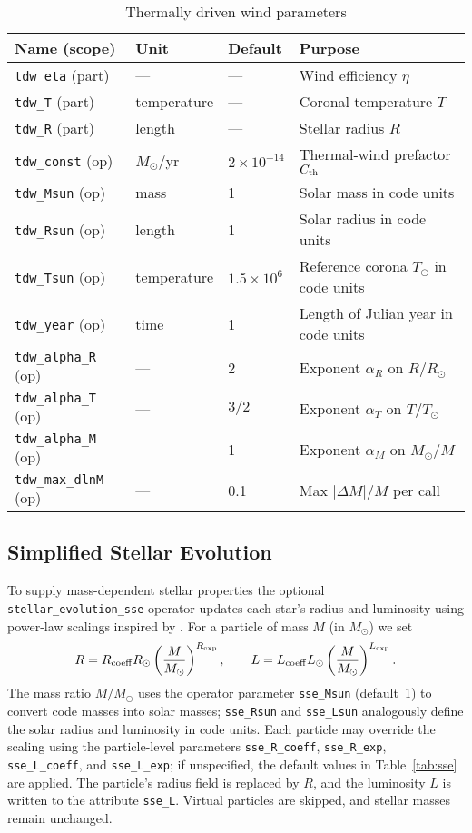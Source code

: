 \documentclass[11pt]{article}
\begin{document}
\begin{table}[h]
\centering\footnotesize
\caption{Thermally driven wind parameters}
\label{tab:tdw}
\begin{tabular}{@{}llll@{}}
\toprule
Name (scope) & Unit & Default & Purpose \\
\midrule
\texttt{tdw\_eta} (part) & — & — & Wind efficiency $\eta$\\
\texttt{tdw\_T}   (part) & temperature & — & Coronal temperature $T$\\
\texttt{tdw\_R}   (part) & length & — & Stellar radius $R$\\[0.2em]
\texttt{tdw\_const} (op) & $M_\odot$/yr & $2\times10^{-14}$ & Thermal-wind prefactor $C_{\rm th}$\\
\texttt{tdw\_Msun}  (op) & mass & 1 & Solar mass in code units\\
\texttt{tdw\_Rsun}  (op) & length & 1 & Solar radius in code units\\
\texttt{tdw\_Tsun}  (op) & temperature & $1.5\times10^6$ & Reference corona $T_\odot$ in code units\\
\texttt{tdw\_year}  (op) & time & 1 & Length of Julian year in code units\\
\texttt{tdw\_alpha\_R} (op) & — & 2 & Exponent $\alpha_R$ on $R/R_\odot$\\
\texttt{tdw\_alpha\_T} (op) & — & $3/2$ & Exponent $\alpha_T$ on $T/T_\odot$\\
\texttt{tdw\_alpha\_M} (op) & — & 1 & Exponent $\alpha_M$ on $M_\odot/M$\\
\texttt{tdw\_max\_dlnM} (op) & — & 0.1 & Max $|\Delta M|/M$ per call\\
\bottomrule
\end{tabular}
\end{table}

\subsection{Simplified Stellar Evolution}
\label{sec:sse}

To supply mass-dependent stellar properties the optional
\texttt{stellar\_evolution\_sse} operator updates each star's radius and
luminosity using power-law scalings inspired by \citet{Hurley2000}. For a
particle of mass $M$ (in $M_\odot$) we set
\[
R = R_{\rm coeff} R_\odot \left(\frac{M}{M_\odot}\right)^{R_{\rm exp}},\qquad
L = L_{\rm coeff} L_\odot \left(\frac{M}{M_\odot}\right)^{L_{\rm exp}}.
\]
The mass ratio $M/M_\odot$ uses the operator parameter
\texttt{sse\_Msun} (default 1) to convert code masses into solar masses;
\texttt{sse\_Rsun} and \texttt{sse\_Lsun} analogously define the solar radius
and luminosity in code units.  Each particle may override the scaling using the
particle-level parameters \texttt{sse\_R\_coeff}, \texttt{sse\_R\_exp},
\texttt{sse\_L\_coeff}, and \texttt{sse\_L\_exp}; if unspecified, the default
values in Table~\ref{tab:sse} are applied.  The particle's radius field is
replaced by $R$, and the luminosity $L$ is written to the attribute
\texttt{sse\_L}. Virtual particles are skipped, and stellar masses remain
unchanged.
\end{document}
